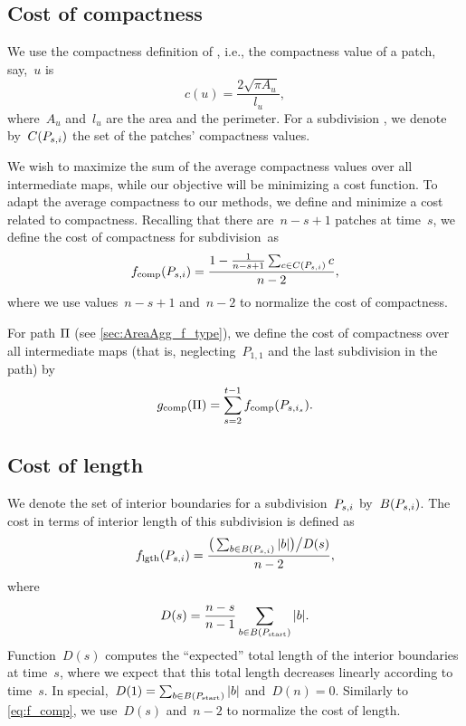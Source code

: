 \documentclass[acmsmall,natbib=false]{acmart}
\begin{document}
\subsection{Cost of compactness}
\label{sec:AreaAgg_f_comp}

We use the compactness definition of \citet{Frolov1975}, 
i.e., the compactness value of a patch, say,~$u$ is
\begin{equation}
\label{eq:comp}
c(u)=\frac{2 \sqrt{\pi A_u}}{l_u},
\end{equation}
where~$A_u$ and~$l_u$ are 
the area and the perimeter. 
For a subdivision \Psnode, we denote by~$C(P_{s,i})$ 
the set of the patches' compactness values.

We wish to maximize the sum of the average compactness values 
over all intermediate maps,
while our objective will be
minimizing a cost function.
To adapt the average compactness to our methods, 
we define and minimize a cost related to compactness.
Recalling that there are~$n-s+1$ patches at time~$s$,
we define the cost of compactness for subdivision~\Psnode as
\begin{equation}
\label{eq:f_comp}
f_\mathrm{comp}(P_{s,i})=
\frac{1-\frac{1}{n-s+1} \sum_{c\in C(P_{s,i})}c}{n-2},
\end{equation}
where we use values~$n-s+1$ and~$n-2$ to normalize 
the cost of compactness.

For path $\Pi$ (see \sect\ref{sec:AreaAgg_f_type}),  
we define the cost of compactness over all 
intermediate maps
(that is, neglecting~$P_{1,1}$ 
and the last subdivision in the path) by
\begin{equation}
\label{eq:g_comp}
g_\mathrm{comp}(\Pi)=
\sum_{s=2}^{t-1}f_{\mathrm{comp}}(P_{s,i_s}).
\end{equation}


\subsection{Cost of length}
\label{sec:AreaAgg_costlength}

We denote the set of interior boundaries 
for a subdivision~$P_{s,i}$ by~$B(P_{s,i})$.
The cost in terms of interior length of 
this subdivision is defined as
\begin{equation}
\label{eq:f_length}
f_\mathrm{lgth}(P_{s,i})=
\frac{\big(\sum_{b\in B (P_{s,i})} 
	|b|\big)\big/D(s)}{n-2}, 
\end{equation} 
where 
\begin{equation}
\label{eq:AreaAgg_Norm}
D(s)=\frac{n-s}{n-1} \sum_{b\in B (P_\mathrm{start})} |b|.
\end{equation}
Function~$D(s)$ computes the ``expected'' total length of 
the interior boundaries at time~$s$,
where we expect that this total length decreases linearly
according to time~$s$.
In special,~$D(1) = \sum_{b\in B (P_\mathrm{start})} |b|$
and~$D(n) = 0$.
Similarly to \eq\ref{eq:f_comp}, 
we use~$D(s)$ and~$n-2$ to normalize 
the cost of length.
\end{document}
